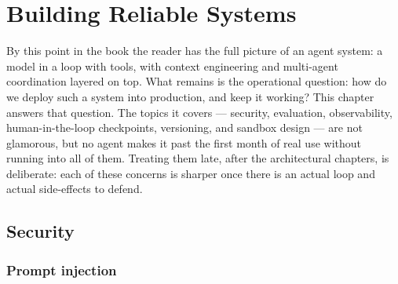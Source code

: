 %

\chapter{Building Reliable Systems}
\label{ch:reliable}


By this point in the book the reader has the full picture of an
agent system: a model in a loop with tools, with context
engineering and multi-agent coordination layered on top. What
remains is the operational question: how do we deploy such a
system into production, and keep it working? This chapter answers
that question. The topics it covers --- security, evaluation,
observability, human-in-the-loop checkpoints, versioning, and
sandbox design --- are not glamorous, but no agent makes it past
the first month of real use without running into all of them.
Treating them late, after the architectural chapters, is
deliberate: each of these concerns is sharper once there is an
actual loop and actual side-effects to defend.

\section{Security}
\label{sec:reliable-security}


\subsection{Prompt injection}
\label{sec:reliable-injection}

